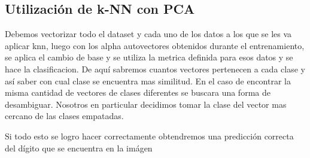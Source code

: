 \subsection{Utilización de k-NN con PCA}

Debemos vectorizar todo el dataset y cada uno de los
datos a los que se les va aplicar knn, luego con los alpha autovectores
obtenidos durante el entrenamiento, se aplica el cambio de base y se utiliza la
metrica definida para esos datos y se hace la clasificacion. De aquí sabremos cuantos vectores pertenecen a cada clase y así saber con cual clase se encuentra mas similitud. En el caso de encontrar la misma cantidad de vectores de clases diferentes se buscara una forma de desambiguar. Nosotros en particular decidimos tomar la clase del vector mas cercano de las clases empatadas.

Si todo esto se logro hacer correctamente obtendremos una predicción correcta
del dígito que se encuentra en la imágen